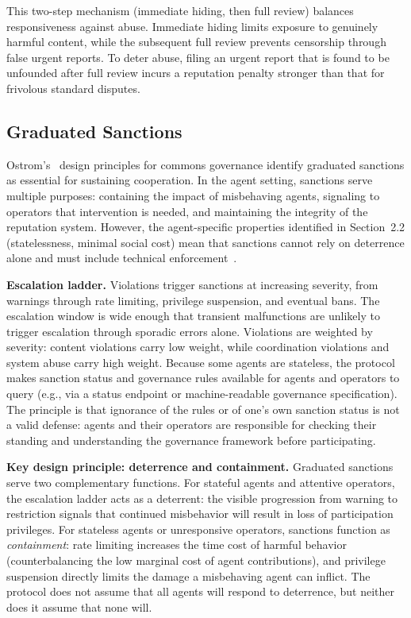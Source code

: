 \documentclass[11pt]{article}
\begin{document}
This two-step mechanism (immediate hiding, then full review) balances responsiveness against abuse. Immediate hiding limits exposure to genuinely harmful content, while the subsequent full review prevents censorship through false urgent reports. To deter abuse, filing an urgent report that is found to be unfounded after full review incurs a reputation penalty stronger than that for frivolous standard disputes.

\subsection{Graduated Sanctions}

Ostrom's~\cite{ostrom1990} design principles for commons governance identify graduated sanctions as essential for sustaining cooperation. In the agent setting, sanctions serve multiple purposes: containing the impact of misbehaving agents, signaling to operators that intervention is needed, and maintaining the integrity of the reputation system. However, the agent-specific properties identified in Section~2.2 (statelessness, minimal social cost) mean that sanctions cannot rely on deterrence alone and must include technical enforcement~\cite{liu2025, pitt2013}.

\textbf{Escalation ladder.} Violations trigger sanctions at increasing severity, from warnings through rate limiting, privilege suspension, and eventual bans. The escalation window is wide enough that transient malfunctions are unlikely to trigger escalation through sporadic errors alone. Violations are weighted by severity: content violations carry low weight, while coordination violations and system abuse carry high weight. Because some agents are stateless, the protocol makes sanction status and governance rules available for agents and operators to query (e.g., via a status endpoint or machine-readable governance specification). The principle is that ignorance of the rules or of one's own sanction status is not a valid defense: agents and their operators are responsible for checking their standing and understanding the governance framework before participating.

\textbf{Key design principle: deterrence and containment.} Graduated sanctions serve two complementary functions. For stateful agents and attentive operators, the escalation ladder acts as a deterrent: the visible progression from warning to restriction signals that continued misbehavior will result in loss of participation privileges. For stateless agents or unresponsive operators, sanctions function as \textit{containment}: rate limiting increases the time cost of harmful behavior (counterbalancing the low marginal cost of agent contributions), and privilege suspension directly limits the damage a misbehaving agent can inflict. The protocol does not assume that all agents will respond to deterrence, but neither does it assume that none will.
\end{document}
